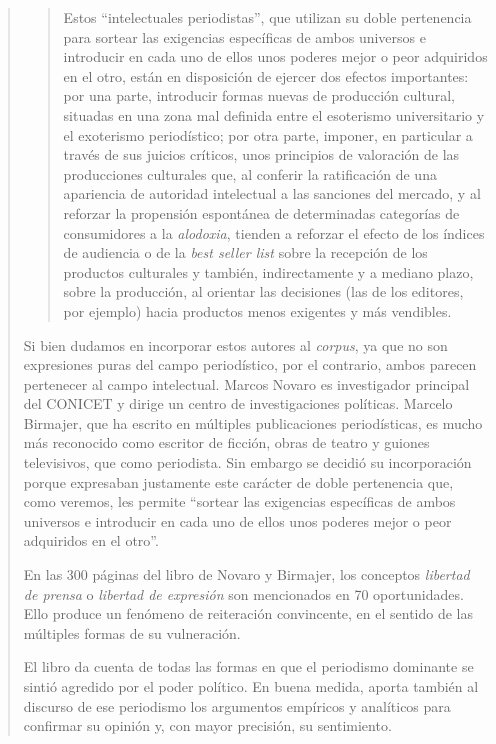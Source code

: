 \begin{quote}
\begin{quote}
	Estos \enquote{intelectuales periodistas}, que utilizan su doble pertenencia para sortear las exigencias específicas de ambos universos e introducir en cada uno de ellos unos poderes mejor o peor adquiridos en el otro, están en disposición de ejercer dos efectos importantes: por una parte, introducir formas nuevas de producción cultural, situadas en una zona mal definida entre el esoterismo universitario y el exoterismo periodístico; por otra parte, imponer, en particular a través de sus juicios críticos, unos principios de valoración de las producciones culturales que, al conferir la ratificación de una apariencia de autoridad intelectual a las sanciones del mercado, y al reforzar la propensión espontánea de determinadas categorías de consumidores a la \emph{alodoxia}, tienden a reforzar el efecto de los índices de audiencia o de la \emph{best seller list} sobre la recepción de los productos culturales y también, indirectamente y a mediano plazo, sobre la producción, al orientar las decisiones (las de los editores, por ejemplo) hacia productos menos exigentes y más vendibles.
\end{quote}


Si bien dudamos en incorporar estos autores al \emph{corpus}, ya que no son expresiones puras del campo periodístico, por el contrario, ambos parecen pertenecer al campo intelectual. Marcos Novaro es investigador principal del CONICET y dirige un centro de investigaciones políticas. Marcelo Birmajer, que ha escrito en múltiples publicaciones periodísticas, es mucho más reconocido como escritor de ficción, obras de teatro y guiones televisivos, que como periodista. Sin embargo se decidió su incorporación porque expresaban justamente este carácter de doble pertenencia que, como veremos, les permite  \enquote{sortear las exigencias específicas de ambos universos e introducir en cada uno de ellos unos poderes mejor o peor adquiridos en el otro}.

En las 300 páginas del libro de Novaro y Birmajer, los conceptos \emph{libertad de prensa} o \emph{libertad de expresión} son mencionados en 70 oportunidades. Ello produce un fenómeno de reiteración convincente, en el sentido de las múltiples formas de su vulneración.

El libro da cuenta de todas las formas en que el periodismo dominante se sintió agredido por el poder político. En buena medida, aporta también al discurso de ese periodismo los argumentos empíricos y analíticos para confirmar su opinión y, con mayor precisión, su sentimiento.


\end{quote}
